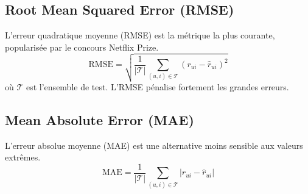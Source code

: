 \subsection{Root Mean Squared Error (RMSE)}
L'erreur quadratique moyenne (RMSE) est la métrique la plus courante, popularisée par le concours Netflix Prize.
\begin{equation}
\label{eq:rmse_annexe}
\text{RMSE} = \sqrt{\frac{1}{|\mathcal{T}|} \sum_{(u,i) \in \mathcal{T}} (r_{ui} - \hat{r}_{ui})^2}
\end{equation}
où $\mathcal{T}$ est l'ensemble de test. L'RMSE pénalise fortement les grandes erreurs.

\subsection{Mean Absolute Error (MAE)}
L'erreur absolue moyenne (MAE) est une alternative moins sensible aux valeurs extrêmes.
\begin{equation}
\label{eq:mae_annexe}
\text{MAE} = \frac{1}{|\mathcal{T}|} \sum_{(u,i) \in \mathcal{T}} |r_{ui} - \hat{r}_{ui}|
\end{equation}

